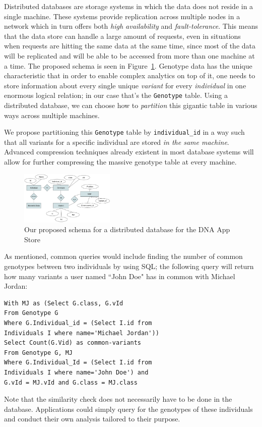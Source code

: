 \documentclass[conference,twocolumn,10pt]{IEEEtran}
\begin{document}
Distributed databases are storage systems in which the data does not reside in a single machine. These systems provide replication across multiple nodes in a network which in turn offers both \textit{high availability} and \textit{fault-tolerance}. This means that the data store can handle a large amount of requests, even in situations when requests are hitting the same data at the same time, since most of the data will be replicated and will be able to be accessed from more than one machine at a time. The proposed schema is seen in Figure~\ref{fig:schema}. Genotype data has the unique characteristic that in order to enable complex analytics on top of it, one needs to store information about every single unique \textit{variant} for every \textit{individual} in one enormous logical relation; in our case that's the \texttt{Genotype} table. Using a distributed database, we can choose how to \textit{partition} this gigantic table in various ways across multiple machines.

We propose partitioning this \texttt{Genotype} table by \texttt{individual\_id} in a way such that all variants for a specific individual are stored \textit{in the same machine}. Advanced compression techniques already existent in most database systems will allow for further compressing the massive genotype table at every machine.

\begin{figure}[t]
    \centering
    \includegraphics[width=0.40\textwidth]{schema}
    \caption{Our proposed schema for a distributed database for the DNA App Store}
    \label{fig:schema}
\end{figure}

As mentioned, common queries would include finding the number of common genotypes between two individuals by using SQL; the following query will return how many variants a user named ``John Doe" has in common with Michael Jordan:
\begin{lstlisting}
With MJ as (Select G.class, G.vId
From Genotype G
Where G.Individual_id = (Select I.id from
Individuals I where name='Michael Jordan'))
Select Count(G.Vid) as common-variants
From Genotype G, MJ
Where G.Individual_Id = (Select I.id from
Individuals I where name='John Doe') and
G.vId = MJ.vId and G.class = MJ.class
\end{lstlisting}
Note that the similarity check does not necessarily have to be done in the database. Applications could simply query for the genotypes of these individuals and conduct their own analysis tailored to their purpose.
\end{document}
